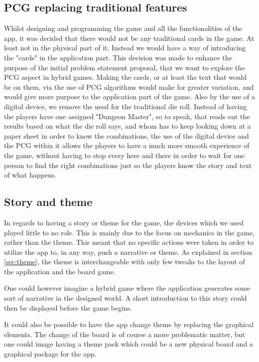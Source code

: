 \subsection{PCG replacing traditional features}
Whilst designing and programming the game and all the functionalities of the app, it was decided that there would not be any traditional cards in the game. At least not in the physical part of it. Instead we would have a way of introducing the "cards" in the application part. This decision was made to enhance the purpose of the initial problem statement proposal, that we want to explore the PCG aspect in hybrid games. Making the cards, or at least the text that would be on them, via the use of PCG algorithms would make for greater variation, and would give more purpose to the application part of the game. Also by the use of a digital device, we remove the need for the traditional die roll. Instead of having the players have one assigned "Dungeon Master", so to speak, that reads out the results based on what the die roll says, and whom has to keep looking down at a paper sheet in order to know the combinations, the use of the digital device and the PCG within it allows the players to have a much more smooth experience of the game, without having to stop every here and there in order to wait for one person to find the right combinations just so the players know the story and text of what happens.

\subsection{Story and theme}
In regards to having a story or theme for the game, the devices which we used played little to no role. 
This is mainly due to the focus on mechanics in the game, rather than the theme. This meant that no specific actions were taken in order to utilize the app to, in any way, push a narrative or theme.
As explained in section \ref{sec:theme}, the theme is interchangeable with only few tweaks to the layout of the application and the board game. 

One could however imagine a hybrid game where the application generates some sort of narrative in the designed world. A short introduction to this story could then be displayed before the game begins. 

It could also be possible to have the app change theme by replacing the graphical elements. The change of the board is of course a more problematic matter, but one could image having a theme pack which could be a new physical board and a graphical package for the app.

